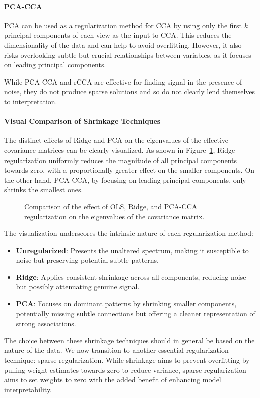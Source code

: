 \paragraph{PCA-CCA} PCA can be used as a regularization method for CCA by using only the first \( k \) principal components of each view as the input to CCA.
This reduces the dimensionality of the data and can help to avoid overfitting.
However, it also risks overlooking subtle but crucial relationships between variables, as it focuses on leading principal components.

While PCA-CCA and rCCA are effective for finding signal in the presence of noise, they do not produce sparse
solutions and so do not clearly lend themselves to interpretation.

\paragraph{Visual Comparison of Shrinkage Techniques}

The distinct effects of Ridge and PCA on the eigenvalues of the effective covariance matrices can be clearly visualized.
As shown in Figure~\ref{fig:shrinkage}, Ridge regularization uniformly reduces the magnitude of all principal components towards zero, with a proportionally greater effect on the smaller components.
On the other hand, PCA-CCA, by focusing on leading principal components, only shrinks the smallest ones.

\begin{figure}
    \centering
    
    \caption{Comparison of the effect of OLS, Ridge, and PCA-CCA regularization on the eigenvalues of the covariance matrix.}\label{fig:shrinkage}
\end{figure}

The visualization underscores the intrinsic nature of each regularization method:
\begin{itemize}
    \item \textbf{Unregularized}: Presents the unaltered spectrum, making it susceptible to noise but preserving potential subtle patterns.
    \item \textbf{Ridge}: Applies consistent shrinkage across all components, reducing noise but possibly attenuating genuine signal.
    \item \textbf{PCA}: Focuses on dominant patterns by shrinking smaller components, potentially missing subtle connections but offering a cleaner representation of strong associations.
\end{itemize}
The choice between these shrinkage techniques should in general be based on the nature of the data.
We now transition to another essential regularization technique: sparse regularization.
While shrinkage aims to prevent overfitting by pulling weight estimates towards zero to reduce variance, sparse regularization aims to set weights to zero with the added benefit of enhancing model interpretability.

